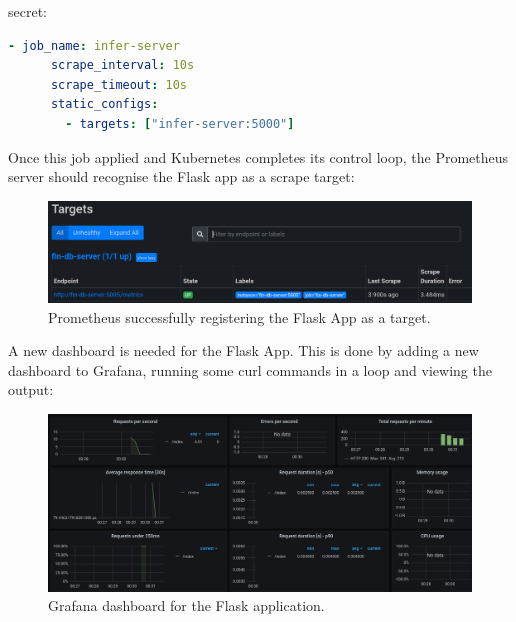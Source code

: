 secret:
\begin{lstlisting}[language=yaml,label={flask_prometheus_job},caption={Prometheus job for the Flask App.}]
    - job_name: infer-server
      scrape_interval: 10s
      scrape_timeout: 10s
      static_configs:
        - targets: ["infer-server:5000"]
\end{lstlisting}
Once this job applied and Kubernetes completes its control loop, the Prometheus server should recognise the Flask app as a scrape target:
\begin{figure}[H]
	\centering
	\includegraphics[width=1\linewidth]{figures/fin-db-server-prom-target.png}
	\caption{Prometheus successfully registering the Flask App as a target.}
	\label{fig:fin-db-server-prom-target}
\end{figure}
A new dashboard is needed for the Flask App. This is done by adding a new dashboard to Grafana, running some curl commands in a loop and
viewing the output:
\begin{figure}[H]
	\centering
	\includegraphics[width=1\linewidth]{figures/findb_grafana_dash.png}
	\caption{Grafana dashboard for the Flask application.}
	\label{fig:flask_app_dash}
\end{figure}

